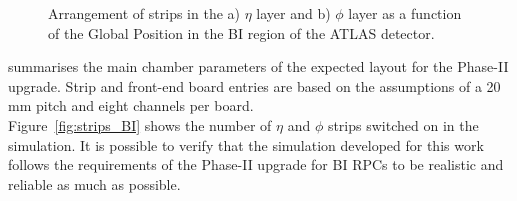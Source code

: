 \begin{figure}[!h]
	\centering	
	\caption{Arrangement of strips in the a) $\eta$ layer and b) $\phi$ layer as a function of the Global Position in the BI region of the ATLAS detector.}
	\label{fig:Nstrips}
\end{figure}	
\newpage
\noindent {} summarises the main chamber parameters of the expected layout 
for the Phase-II upgrade. Strip and front-end board 
entries are based on the assumptions of a 20 mm pitch and eight channels per board.\\
Figure~\ref{fig:strips_BI} shows the number of $\eta$ and $\phi$ strips switched on in the 
simulation. It is possible to verify that the simulation developed for this work follows the requirements of the Phase-II upgrade for BI RPCs to be realistic and reliable as much as possible.
